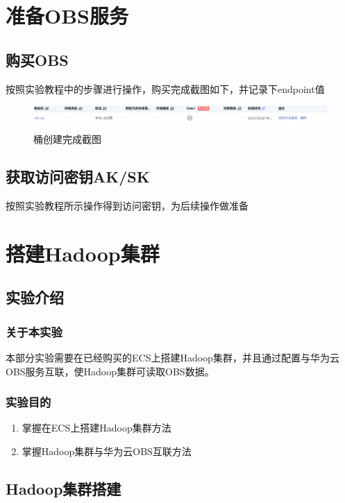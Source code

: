 \documentclass{../source/zjureport}
\begin{document}
    \section{准备OBS服务}
        \subsection{购买OBS}
        按照实验教程中的步骤进行操作，购买完成截图如下，并记录下endpoint值
        \begin{figure}[H]
            \centering
            \includegraphics[width = \textwidth]{figure/创建桶.png}
            \caption*{桶创建完成截图}
        \end{figure}

        \subsection{获取访问密钥AK/SK}
        按照实验教程所示操作得到访问密钥，为后续操作做准备

    \section{搭建Hadoop集群}
        \subsection{实验介绍}
            \subsubsection{关于本实验}
            本部分实验需要在已经购买的ECS上搭建Hadoop集群，并且通过配置与华为云OBS服务互联，使Hadoop集群可读取OBS数据。

            \subsubsection{实验目的}
            \begin{enumerate}
                \item 掌握在ECS上搭建Hadoop集群方法
                \item 掌握Hadoop集群与华为云OBS互联方法
            \end{enumerate}

        \subsection{Hadoop集群搭建}
\end{document}
